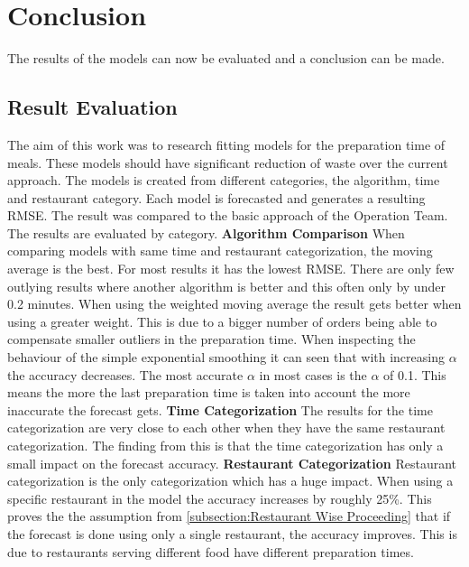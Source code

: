 \chapter{Conclusion}\label{chapter:Conclusion}
The results of the models can now be evaluated and a conclusion can be made.
\section{Result Evaluation}
The aim of this work was to research fitting models for the preparation time of meals. These models should have significant reduction of waste over the current approach.\newline
The models is created from different categories, the algorithm, time and restaurant category. Each model is forecasted and generates a resulting RMSE. The result was compared to the basic approach of the Operation Team.\newline
The results are evaluated by category.\newline
\newline\textbf{Algorithm Comparison}\newline
When comparing models with same time and restaurant categorization, the moving average is the best. For most results it has the lowest RMSE. There are only few outlying results where another algorithm is better and this often only by under 0.2 minutes.\newline
When using the weighted moving average the result gets better when using a greater weight. This is due to a bigger number of orders being able to compensate smaller outliers in the preparation time.\newline
When inspecting the behaviour of the simple exponential smoothing it can seen that with increasing $\alpha$ the accuracy decreases. The most accurate $\alpha$ in most cases is the $\alpha$ of 0.1. This means the more the last preparation time is taken into account the more inaccurate the forecast gets.
\newline\textbf{Time Categorization}\newline
The results for the time categorization are very close to each other when they have the same restaurant categorization. The finding from this is that the time categorization has only a small impact on the forecast accuracy.
\newline\textbf{Restaurant Categorization}\newline
Restaurant categorization is the only categorization which has a huge impact. When using a specific restaurant in the model the accuracy increases by roughly 25\%. This proves the the assumption from \ref{subsection:Restaurant Wise Proceeding} that if the forecast is done using only a single restaurant, the accuracy improves. This is due to restaurants serving different food have different preparation times.

